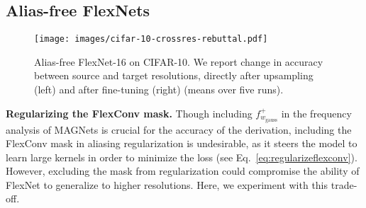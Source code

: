 \documentclass{article} \usepackage{iclr2022_conference,times}
\begin{document}
\subsection{Alias-free FlexNets}
\label{sec:crossresexperiments}
\vspace{-1mm}
\begin{figure}[t]
        \centering
    \texttt{[image: images/cifar-10-crossres-rebuttal.pdf]}
    \vspace{-6mm}
    \caption{Alias-free FlexNet-16 on CIFAR-10. We report change in accuracy between source and target resolutions, directly after upsampling (left) and after fine-tuning (right) (means over five runs).
    \vspace{-5mm}}
    \vspace{-2mm}
    \label{fig:c10-crossres}
\end{figure}

\textbf{Regularizing the FlexConv mask.} Though including $f^+_{w_{\mathrm{gauss}}}$ in the frequency analysis of MAGNets is crucial for the accuracy of the derivation, including the FlexConv mask in aliasing regularization is undesirable, as it steers the model to learn large kernels in order to minimize the loss (see Eq.~\ref{eq:regularizeflexconv}). However, excluding the mask from regularization could compromise the ability of FlexNet to generalize to higher resolutions. Here, we experiment with this trade-off.

\newlength{\oldintextsep}
\setlength{\oldintextsep}{\intextsep}
\end{document}
